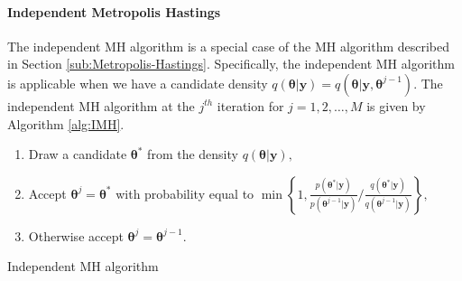 \documentclass[article]{jss}
\begin{document}
\paragraph{Independent Metropolis Hastings}

The independent MH algorithm is a special case of the MH algorithm
described in Section \ref{sub:Metropolis-Hastings}. Specifically, the
independent MH algorithm is applicable when we have a candidate
density
$q(\bm{\theta}|\bm{y})=q(\bm{\theta}|\bm{y},\bm{\theta}^{j-1})$.  The
independent MH algorithm at the $j^{th}$ iteration for
$j=1,2,\ldots,M$ is given by Algorithm \ref{alg:IMH}.

%
\begin{algorithm}[H]
\begin{enumerate}
\item Draw a candidate $\bm{\bm{\theta}}^{\ast}$ from the density $q\left(\bm{\bm{\theta}}|\bm{y}\right),$ 
\item Accept $\bm{\theta}^{j}=\bm{\theta}^{\ast}$ with probability equal
to $\min\left\{ 1,\frac{p\left(\bm{\theta}^{\ast}|\bm{y}\right)}{p\left(\bm{\theta}^{j-1}|\bm{y}\right)}/\frac{q\left(\bm{\theta}^{\ast}|\bm{y}\right)}{q\left(\bm{\theta}^{j-1}|\bm{y}\right)}\right\} ,$ 
\item Otherwise accept $\bm{\theta}^{j}=\bm{\theta}^{j-1}.$ 
\end{enumerate}
\caption{Independent MH algorithm}
\label{alg:IMH}
\end{algorithm}
\end{document}
